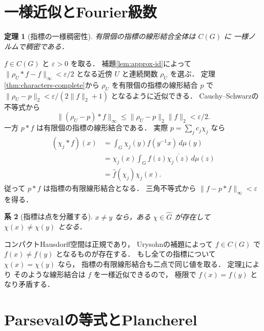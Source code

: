 \documentclass[a5paper,10pt,onecolumn]{jsarticle}
\makeatletter
\theoremstyle{mathnotetheorem}
\newtheorem{theorem}{定理}[section]
\newtheorem{corollary}[theorem]{系}
\renewcommand{\proofname}{証明}
\renewenvironment{proof}[1][\proofname]{%
  \par\pushQED{\qed}\normalfont\topsep4\p@\@plus2\p@\relax
  \trivlist\item[\hskip\labelsep\bfseries #1]\ignorespaces
}{\popQED\endtrivlist\@endpefalse}
\newcommand{\norm}[1]{\lVert #1\rVert}
\makeatother
\begin{document}
\section{一様近似とFourier級数}

\begin{theorem}[指標の一様稠密性]\label{thm:uniform-density}
有限個の指標の線形結合全体は $C(G)$ に
一様ノルムで稠密である．
\end{theorem}
\begin{proof}
$f\in C(G)$ と $\varepsilon>0$ を取る．
補題\ref{lem:approx-id}によって
$\norm{\rho_U*f-f}_\infty<\varepsilon/2$
となる近傍 $U$ と連続関数 $\rho_U$ を選ぶ．
定理\ref{thm:characters-complete}から
$\rho_U$ を有限個の指標の線形結合 $p$ で
$\norm{\rho_U-p}_2<\varepsilon/(2\norm f_2+1)$
となるように近似できる．
Cauchy--Schwarzの不等式から
\[
 \norm{(\rho_U-p)*f}_\infty
 \le\norm{\rho_U-p}_2\norm f_2<\varepsilon/2.
\]
一方 $p*f$ は有限個の指標の線形結合である．
実際 $p=\sum_jc_j\chi_j$ なら
\[
 \begin{aligned}
 (\chi_j*f)(x)
 &=\int_G\chi_j(y)f(y^{-1}x)\,d\mu(y)\\
 &=\chi_j(x)\int_Gf(z)\overline{\chi_j(z)}\,d\mu(z)\\
 &=\widehat f(\chi_j)\chi_j(x).
 \end{aligned}
\]
従って $p*f$ は指標の有限線形結合となる．
三角不等式から
$\norm{f-p*f}_\infty<\varepsilon$ を得る．
\end{proof}

\begin{corollary}[指標は点を分離する]\label{cor:separate}
$x\ne y$ なら，ある $\chi\in\widehat G$ が存在して
$\chi(x)\ne\chi(y)$ となる．
\end{corollary}
\begin{proof}
コンパクトHausdorff空間は正規であり，
Urysohnの補題によって
$f\in C(G)$ で $f(x)\ne f(y)$ となるものが存在する．
もし全ての指標について $\chi(x)=\chi(y)$ なら，
指標の有限線形結合も二点で同じ値を取る．
定理\ref{thm:uniform-density}により
そのような線形結合は $f$ を一様近似できるので，
極限で $f(x)=f(y)$ となり矛盾する．
\end{proof}

\section{Parsevalの等式とPlancherel}
\end{document}
